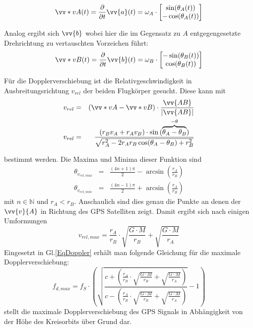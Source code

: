 \begin{equation}
    \vv*{v}{A}(t)=\frac{\partial}{\partial t}\vv{a}(t)
    = \omega_A \cdot \begin{bmatrix} 
        \sin(\theta_A(t))\\ 
        -\cos(\theta_A(t)) 
    \end{bmatrix}
\end{equation}

Analog ergibt sich $\vv{b}$ wobei hier die im Gegensatz zu $A$ entgegengesetzte Drehrichtung zu vertauschten Vorzeichen führt:
\begin{equation}
    \vv*{v}{B}(t)=\frac{\partial}{\partial t}\vv{b}(t)
    = \omega_B \cdot \begin{bmatrix} 
        -\sin(\theta_B(t))\\ 
        \cos(\theta_B(t)) 
    \end{bmatrix}
\end{equation}

Für die Dopplerverschiebung ist die Relativgeschwindigkeit in Ausbreitungsrichtung $v_{rel}$ der beiden Flugkörper gesucht. Diese kann mit 
\begin{eqnarray}
    v_{rel} &=&(\vv*{v}{A}-\vv*{v}{B} ) \cdot \frac{\vv{AB}}{|\vv{AB}|}\\
     v_{rel} &=& \frac{(r_B v_A + r_A v_B) \cdot \sin{(\overbrace{\theta_A-\theta_B}^{-\theta}})}{\sqrt{r_A^2-2 r_A r_B \cos(\theta_A-\theta_B)+r_B^2}}
\end{eqnarray}

bestimmt werden. Die Maxima und Minima dieser Funktion sind
\begin{eqnarray}
    \theta_{v_{rel,max}}&=&\frac{(4n+1)\pi}{2}-\arcsin\left(\frac{r_A}{r_B}\right)\\
    \theta_{v_{rel,min}}&=&\frac{(4n-1)\pi}{2}+\arcsin\left(\frac{r_A}{r_B}\right)
\end{eqnarray}
mit $n\in \mathbb{N}$ und $r_A<r_B$. Anschaulich sind dies genau die Punkte an denen der $\vv{v}{A}$ in Richtung des GPS Satelliten zeigt. Damit ergibt sich nach einigen Umformungen
\begin{equation}
    v_{rel,max}=\frac{r_A}{r_B}\cdot \sqrt{\frac{G \cdot M}{r_B}} + \sqrt{\frac{G\cdot M}{r_A}}
\end{equation}
Eingesetzt in Gl.\ref{EqDoppler} erhält man folgende Gleichung für die maximale Dopplerverschiebung:
\begin{equation}
	f_{d,max} = f_S \cdot \left(\sqrt{\frac{c+\left(\frac{r_A}{r_B}\cdot \sqrt{\frac{G \cdot M}{r_B}} + \sqrt{\frac{G\cdot M}{r_A}}\right)}{c-\left(\frac{r_A}{r_B}\cdot \sqrt{\frac{G \cdot M}{r_B}} + \sqrt{\frac{G\cdot M}{r_A}}\right)}}-1\right)
\end{equation}
 stellt die maximale Dopplerverschiebung des GPS Signals in Abhängigkeit von der Höhe des Kreisorbits über Grund dar.

